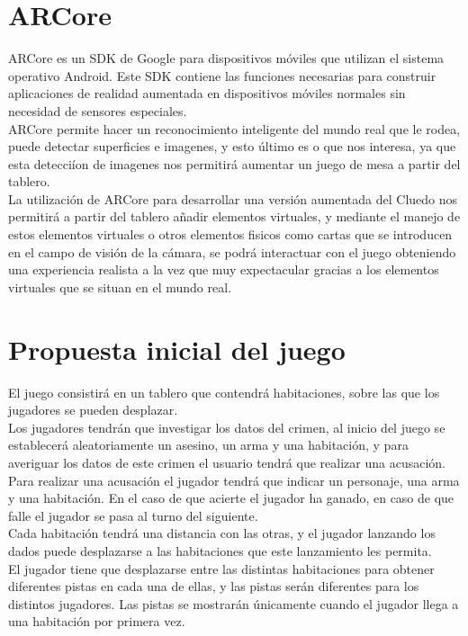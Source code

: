 \section{ARCore}
ARCore es un SDK de Google para dispositivos móviles que utilizan el sistema operativo Android. Este SDK contiene las funciones necesarias para construir aplicaciones de realidad aumentada en dispositivos móviles normales sin necesidad de sensores especiales.\\

ARCore permite hacer un reconocimiento inteligente del mundo real que le rodea, puede detectar superficies e imagenes, y esto último es o que nos interesa, ya que esta detecciíon de imagenes nos permitirá aumentar un juego de mesa a partir del tablero.\\

La utilización de ARCore para desarrollar una versión aumentada del Cluedo nos permitirá a partir del tablero añadir elementos virtuales, y mediante el manejo de estos elementos virtuales o otros elementos fisicos como cartas que se introducen en el campo de visión de la cámara, se podrá interactuar con el juego obteniendo una experiencia realista a la vez que muy expectacular gracias a los elementos virtuales que se situan en el mundo real.

\section{Propuesta inicial del juego}
El juego consistirá en un tablero que contendrá habitaciones, sobre las que los jugadores se pueden desplazar.\\

Los jugadores tendrán que investigar los datos del crimen, al inicio del juego se establecerá aleatoriamente un asesino, un arma y una habitación, y para averiguar los datos de este crimen el usuario tendrá que realizar una acusación.\\

Para realizar una acusación el jugador tendrá que indicar un personaje, una arma y una habitación. En el caso de que acierte el jugador ha ganado, en caso de que falle el jugador se pasa al turno del siguiente.\\

Cada habitación tendrá una distancia con las otras, y el jugador lanzando los dados puede desplazarse a las habitaciones que este lanzamiento les permita.\\

El jugador tiene que desplazarse entre las distintas habitaciones para obtener diferentes pistas en cada una de ellas, y las pistas serán diferentes para los distintos jugadores. Las pistas se mostrarán únicamente cuando el jugador llega a una habitación por primera vez.\\

